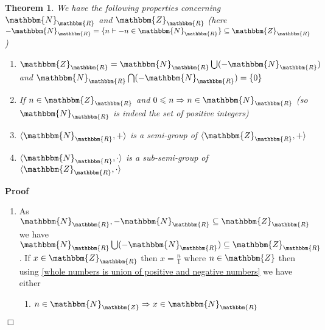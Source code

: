 \documentclass{book}
\newcommand{\um}{-}
\newenvironment{proof}{\noindent\textbf{Proof\ }}{\hspace*{\fill}$\Box$\medskip}
\newtheorem{theorem}{Theorem}
\begin{document}
{{\begin{theorem}
  \label{properties of the natural numbers embeded in the embedded integers}We
  have the following properties concerning $\mathbbm{N}_{\mathbbm{R}}$ and
  $\mathbbm{Z}_{\mathbbm{R}}$ (here $\um \mathbbm{N}_{\mathbbm{R}} = \{ n
  \vdash \um n \in \mathbbm{N}_{\mathbbm{R}} \} \subseteq
  \mathbbm{Z}_{\mathbbm{R}}$)
  \begin{enumerate}
    \item $\mathbbm{Z}_{\mathbbm{R}} =\mathbbm{N}_{\mathbbm{R}} \bigcup (\um
    \mathbbm{N}_{\mathbbm{R}})$ and $\mathbbm{N}_{\mathbbm{R}} \bigcap (\um
    \mathbbm{N}_{\mathbbm{R}}) = \{ 0 \}$
    
    \item If $n \in \mathbbm{Z}_{\mathbbm{R}}$ and $0 \leqslant n \Rightarrow
    n \in \mathbbm{N}_{\mathbbm{R}}$ (so $\mathbbm{N}_{\mathbbm{R}}$ is indeed
    the set of positive integers)
    
    \item $\langle \mathbbm{N}_{\mathbbm{R}}, + \rangle$ is a semi-group of
    $\langle \mathbbm{Z}_{\mathbbm{R}}, + \rangle$
    
    \item $\langle \mathbbm{N}_{\mathbbm{R}}, \cdot \rangle$ is a
    sub-semi-group of $\langle \mathbbm{Z}_{\mathbbm{R}}, \cdot \rangle$
  \end{enumerate}
\end{theorem}

\begin{proof}
  
  \begin{enumerate}
    \item As $\mathbbm{N}_{\mathbbm{R}}, \um \mathbbm{N}_{\mathbbm{R}}
    \subseteq \mathbbm{Z}_{\mathbbm{R}}$ we have $\mathbbm{N}_{\mathbbm{R}}
    \bigcup (\um \mathbbm{N}_{\mathbbm{R}}) \subseteq
    \mathbbm{Z}_{\mathbbm{R}}$. If $x \in \mathbbm{Z}_{\mathbbm{R}}$ then $x =
    \frac{n}{1}$ where $n \in \mathbbm{Z}$ then using \ref{whole numbers is
    union of positive and negative numbers} we have either
    \begin{enumerate}
      \item $n \in \mathbbm{N}_{\mathbbm{Z}} \Rightarrow x \in
      \mathbbm{N}_{\mathbbm{R}}$
      

\end{enumerate}
\end{enumerate}
\end{proof}}}
\end{document}

